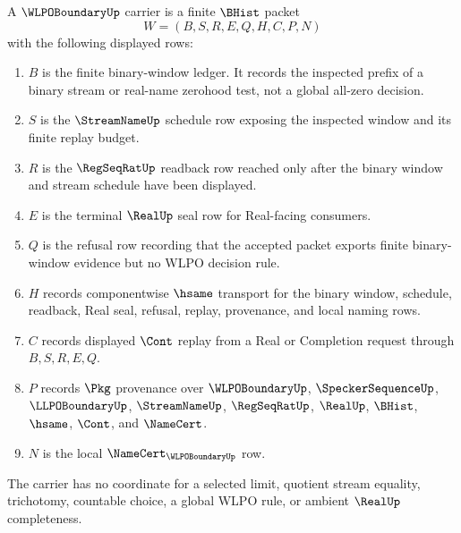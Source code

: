 \begin{definition}
\label{def:wlpo-boundary-carrier}
A $\WLPOBoundaryUp$ carrier is a finite $\BHist$ packet
$$
W=(B,S,R,E,Q,H,C,P,N)
$$
with the following displayed rows:
\begin{enumerate}
\item $B$ is the finite binary-window ledger. It records the inspected prefix of a binary stream or real-name zerohood test, not a global all-zero decision.
\item $S$ is the $\StreamNameUp$ schedule row exposing the inspected window and its finite replay budget.
\item $R$ is the $\RegSeqRatUp$ readback row reached only after the binary window and stream schedule have been displayed.
\item $E$ is the terminal $\RealUp$ seal row for Real-facing consumers.
\item $Q$ is the refusal row recording that the accepted packet exports finite binary-window evidence but no WLPO decision rule.
\item $H$ records componentwise $\hsame$ transport for the binary window, schedule, readback, Real seal, refusal, replay, provenance, and local naming rows.
\item $C$ records displayed $\Cont$ replay from a Real or Completion request through $B,S,R,E,Q$.
\item $P$ records $\Pkg$ provenance over $\WLPOBoundaryUp$, $\SpeckerSequenceUp$, $\LLPOBoundaryUp$, $\StreamNameUp$, $\RegSeqRatUp$, $\RealUp$, $\BHist$, $\hsame$, $\Cont$, and $\NameCert$.
\item $N$ is the local $\NameCert_{\WLPOBoundaryUp}$ row.
\end{enumerate}
The carrier has no coordinate for a selected limit, quotient stream equality, trichotomy, countable choice, a global WLPO rule, or ambient $\RealUp$ completeness.
\end{definition}

